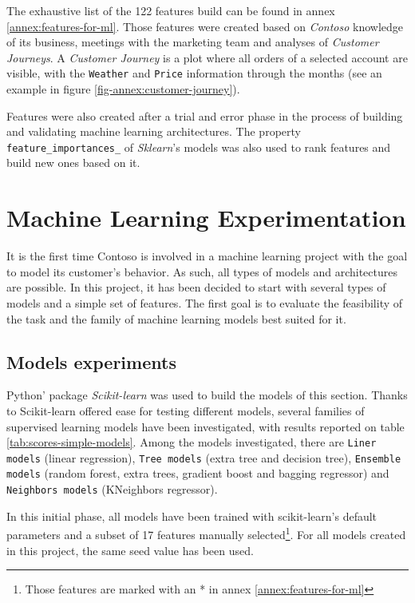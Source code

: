 The exhaustive list of the 122 features build can be found in annex \ref{annex:features-for-ml}. Those features were created based on \textit{Contoso} knowledge of its business, meetings with the marketing team and analyses of \textit{Customer Journeys}. A \textit{Customer Journey} is a plot where all orders of a selected account are visible, with the \texttt{Weather} and \texttt{Price} information through the months (see an example in figure \ref{fig-annex:customer-journey}). 

Features were also created after a trial and error phase in the process of building and validating machine learning architectures. The property \texttt{feature\_importances\_} of \textit{Sklearn}'s models was also used to rank features and build new ones based on it.



\section{Machine Learning Experimentation} \label{sec:ml-experimentation}

It is the first time Contoso is involved in a machine learning project with the goal to model its customer's behavior. As such, all types of models and architectures are possible. In this project, it has been decided to start with several types of models and a simple set of features. The first goal is to evaluate the feasibility of the task and the family of machine learning models best suited for it. 


\subsection{Models experiments}
Python' package \textit{Scikit-learn} was used to build the models of this section. Thanks to Scikit-learn offered ease for testing different models, several families of supervised learning models have been investigated, with results reported on table \ref{tab:scores-simple-models}. Among the models investigated, there are \texttt{Liner models} (linear regression), \texttt{Tree models} (extra tree and decision tree), \texttt{Ensemble models} (random forest, extra trees, gradient boost and bagging regressor) and \texttt{Neighbors models} (KNeighbors regressor).

In this initial phase, all models have been trained with scikit-learn's default parameters and a subset of 17 features manually selected\footnote{Those features are marked with an * in annex \ref{annex:features-for-ml}}. For all models created in this project, the same seed value has been used.

